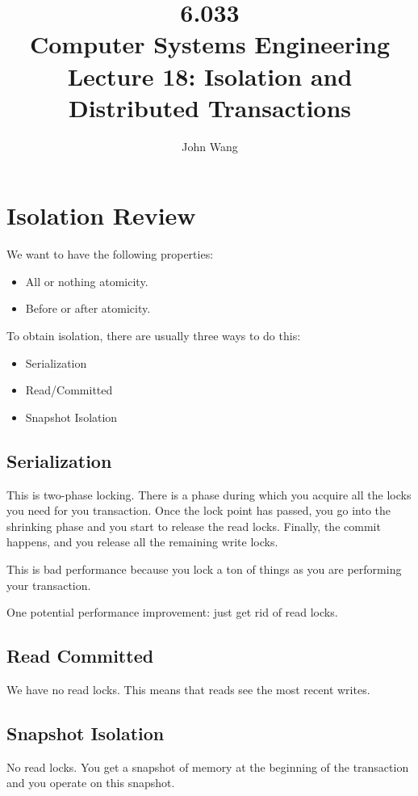 \documentclass[psamsfonts]{amsart}
\title{6.033 \\
Computer Systems Engineering \\
Lecture 18: Isolation and Distributed Transactions}
\author{John Wang}
\begin{document}
\maketitle

\section{Isolation Review}

We want to have the following properties:
\begin{itemize}
  \item All or nothing atomicity.
  \item Before or after atomicity.
\end{itemize}

To obtain isolation, there are usually three ways to do this:
\begin{itemize}
  \item Serialization
  \item Read/Committed
  \item Snapshot Isolation
\end{itemize}

\subsection{Serialization}

This is two-phase locking. There is a phase during which you acquire all the locks you need for you transaction. Once the lock point has passed, you go into the shrinking phase and you start to release the read locks. Finally, the commit happens, and you release all the remaining write locks.

This is bad performance because you lock a ton of things as you are performing your transaction.

One potential performance improvement: just get rid of read locks.

\subsection{Read Committed}

We have no read locks. This means that reads see the most recent writes.

\subsection{Snapshot Isolation}

No read locks. You get a snapshot of memory at the beginning of the transaction and you operate on this snapshot.
\end{document}
